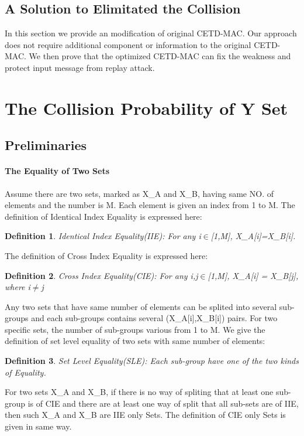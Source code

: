 \documentclass{article}
\newtheorem{defination}{Definition}[section]
\begin{document}
\subsection{A Solution to Elimitated the Collision}
In this section we provide an modification of original CETD-MAC. Our approach does not require additional component or information to the original CETD-MAC. We then prove that the optimized CETD-MAC can fix the weakness and protect input message from replay attack.

\section{The Collision Probability of Y Set}

\subsection{Preliminaries}
\paragraph{The Equality of Two Sets}
Assume there are two sets, marked as X\_A and X\_B, having same NO. of elements and the number is M. Each element is given an index from 1 to M. The definition of Identical Index Equality is expressed here:
\begin{defination}
Identical Index Equality(IIE): For any i$\in$[1,M], X\_A[i]=X\_B[i].
\end{defination}
The definition of Cross Index Equality is expressed here:
\begin{defination}
Cross Index Equality(CIE): For any i,j$\in$[1,M], X\_A[i] = X\_B[j], where i$\neq$j
\end{defination}

Any two sets that have same number of elements can be splited into several sub-groups and each sub-groups contains several (X\_A[i],X\_B[i]) pairs. For two specific sets, the number of sub-groups various from 1 to M. We give the definition of set level equality of two sets with same number of elements:
\begin{defination}
Set Level Equality(SLE): Each sub-group have one of the two kinds of Equality.
\end{defination}

For two sets X\_A and X\_B, if there is no way of spliting that at least one sub-group is of CIE and there are at least one way of split that all sub-sets are of IIE, then such X\_A and X\_B are IIE only Sets. 
The definition of CIE only Sets is given in same way.
\end{document}
